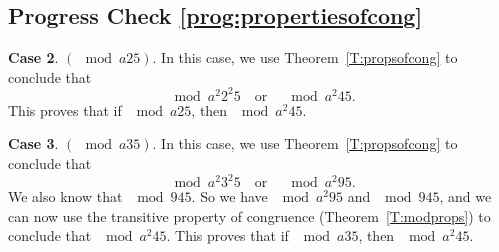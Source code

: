 \subsection*{Progress Check \ref{prog:propertiesofcong}}
\textbf{Case 2}.  $\left( \mod{a}{2}{5} \right)$.  In this case, we use Theorem~\ref{T:propsofcong} to conclude that
\[
\mod{a^2}{2^2}{5} \quad \text{or} \quad \mod{a^2}{4}{5}.
\]
This proves that if $\mod{a}{2}{5}$, then $\mod{a^2}{4}{5}$.

\newpar
\textbf{Case 3}.  $\left( \mod{a}{3}{5} \right)$.  In this case, we use Theorem~\ref{T:propsofcong} to conclude that
\[
\mod{a^2}{3^2}{5} \quad \text{or} \quad \mod{a^2}{9}{5}.
\]
We also know that $\mod{9}{4}{5}$.  So we have $\mod{a^2}{9}{5}$ and $\mod{9}{4}{5}$, and we can now use the transitive property of congruence (Theorem~\ref{T:modprops}) to conclude that $\mod{a^2}{4}{5}$.  This proves that if $\mod{a}{3}{5}$, then $\mod{a^2}{4}{5}$.

\hbreak


\endinput
